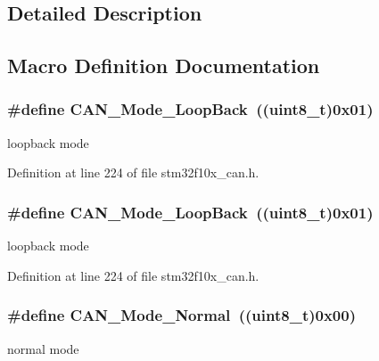 \subsection{Detailed Description}


\subsection{Macro Definition Documentation}
\subsubsection[{\texorpdfstring{C\+A\+N\+\_\+\+Mode\+\_\+\+Loop\+Back}{CAN_Mode_LoopBack}}]{\setlength{\rightskip}{0pt plus 5cm}\#define C\+A\+N\+\_\+\+Mode\+\_\+\+Loop\+Back~(({\bf uint8\+\_\+t})0x01)}\hypertarget{group___c_a_n___mode_gaad036c944403186eb3496ff65020c0ee}{}\label{group___c_a_n___mode_gaad036c944403186eb3496ff65020c0ee}
loopback mode 

Definition at line 224 of file stm32f10x\+\_\+can.\+h.

\subsubsection[{\texorpdfstring{C\+A\+N\+\_\+\+Mode\+\_\+\+Loop\+Back}{CAN_Mode_LoopBack}}]{\setlength{\rightskip}{0pt plus 5cm}\#define C\+A\+N\+\_\+\+Mode\+\_\+\+Loop\+Back~(({\bf uint8\+\_\+t})0x01)}\hypertarget{group___c_a_n___mode_gaad036c944403186eb3496ff65020c0ee}{}\label{group___c_a_n___mode_gaad036c944403186eb3496ff65020c0ee}
loopback mode 

Definition at line 224 of file stm32f10x\+\_\+can.\+h.

\subsubsection[{\texorpdfstring{C\+A\+N\+\_\+\+Mode\+\_\+\+Normal}{CAN_Mode_Normal}}]{\setlength{\rightskip}{0pt plus 5cm}\#define C\+A\+N\+\_\+\+Mode\+\_\+\+Normal~(({\bf uint8\+\_\+t})0x00)}\hypertarget{group___c_a_n___mode_gaaf1f48ab4917ccfd5fd31dd781d59e29}{}\label{group___c_a_n___mode_gaaf1f48ab4917ccfd5fd31dd781d59e29}
normal mode 

